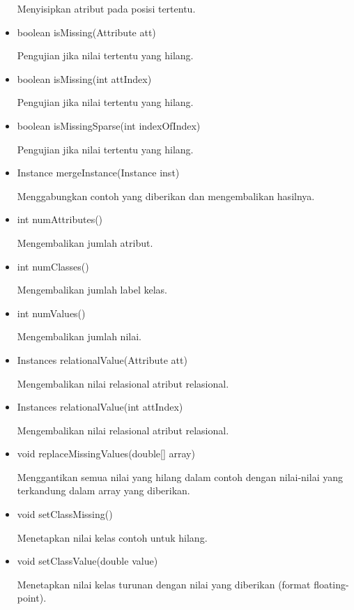 \begin{itemize}
	Menyisipkan atribut pada posisi tertentu.
	
	\item boolean isMissing(Attribute att)
	
	Pengujian jika nilai tertentu yang hilang.
	
	\item boolean isMissing(int attIndex)
	
	Pengujian jika nilai tertentu yang hilang.
	
	\item boolean isMissingSparse(int indexOfIndex)
	
	Pengujian jika nilai tertentu yang hilang.
	
	\item Instance mergeInstance(Instance inst)
	
	Menggabungkan contoh yang diberikan dan mengembalikan hasilnya.
	
	\item int numAttributes()
	
	Mengembalikan jumlah atribut.
	
	\item int numClasses()
	
	Mengembalikan jumlah label kelas.
	
	\item int numValues()
	
	Mengembalikan jumlah nilai.
	
	\item Instances relationalValue(Attribute att)
	
	Mengembalikan nilai relasional atribut relasional.
	
	\item Instances relationalValue(int attIndex)
	
	Mengembalikan nilai relasional atribut relasional.
	
	\item void replaceMissingValues(double[] array)
	
	Menggantikan semua nilai yang hilang dalam contoh dengan nilai-nilai yang terkandung dalam array yang diberikan.
	
	\item void setClassMissing()
	
	Menetapkan nilai kelas contoh untuk hilang.
	
	\item void setClassValue(double value)
	
	Menetapkan nilai kelas turunan dengan nilai yang diberikan (format floating-point).
	

\end{itemize}
